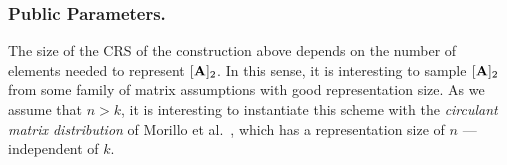 \subsubsection{Public Parameters.} The size of the CRS of the construction above depends on the number of elements needed to represent $[\mathbf{{A}}]_2$. In this sense, it is interesting to sample $[\mathbf{{A}}]_2$ from some family of matrix assumptions with good representation size. As we assume that $n>k$, it is interesting to instantiate this scheme with the \textit{circulant matrix distribution} of Morillo et al.~\cite{EPRINT:MorRafVil15}, which has a representation size of $n$ --- independent of $k$. 



 


